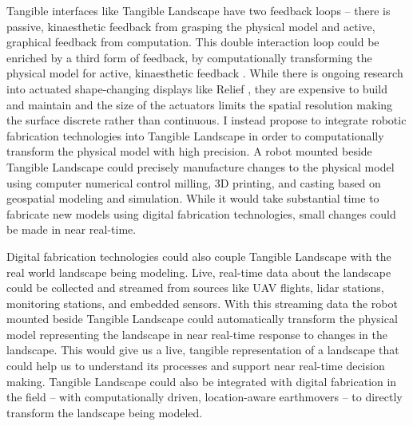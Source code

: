 \documentclass{article}
\begin{document}
Tangible interfaces like Tangible Landscape have two feedback loops -- 
there is passive, kinaesthetic feedback from grasping the physical model 
and active, graphical feedback from computation.
%
This double interaction loop could be enriched by a third form of feedback, 
by computationally transforming the physical model
for active, kinaesthetic feedback 
\citep{Ishii2008}. 
%
While there is ongoing research into actuated shape-changing displays like Relief \citep{Leithinger2010}, 
they are expensive to build and maintain and 
the size of the actuators limits the spatial resolution making the surface discrete rather than continuous. 
%
I instead propose to integrate robotic fabrication technologies into Tangible Landscape 
in order to computationally transform the physical model with high precision.
A robot mounted beside Tangible Landscape could precisely manufacture changes to the physical model using computer numerical control milling, 3D printing, and casting 
based on geospatial modeling and simulation.
While it would take substantial time to fabricate new models using digital fabrication technologies, small changes could be made in near real-time. 
%

Digital fabrication technologies could also couple Tangible Landscape with the real world landscape being modeling.
Live, real-time data about the landscape could be collected and streamed from sources like UAV flights, lidar stations, monitoring stations, and embedded sensors. With this streaming data the robot mounted beside Tangible Landscape could automatically transform the physical model representing the landscape in near real-time response to changes in the landscape. 
%
This would give us a live, tangible representation of a landscape that could help us to understand its processes 
and support near real-time decision making. 
%
Tangible Landscape could also be integrated with digital fabrication in the field -- 
with computationally driven, location-aware earthmovers -- 
to directly transform the landscape being modeled. 



























 
\end{document}
